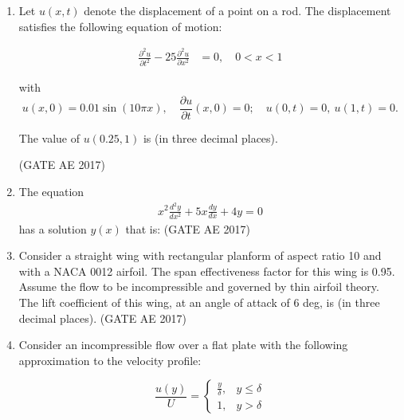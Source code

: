 \documentclass[journal,12pt,onecolumn]{IEEEtran}
\theoremstyle{remark}
\begin{document}
\begin{flushleft}
\begin{enumerate}
\item Let $u(x,t)$ denote the displacement of a point on a rod. The displacement satisfies the following equation of motion:  

\begin{align*}
\frac{\partial^2 u}{\partial t^2} - 25 \frac{\partial^2 u}{\partial x^2} &= 0, \quad 0 < x < 1
\end{align*}

with  
\[
u(x,0) = 0.01 \sin(10 \pi x), \quad \frac{\partial u}{\partial t}(x,0)=0; \quad u(0,t)=0, \ u(1,t)=0.
\]  

The value of $u(0.25,1)$ is \underline{\hspace{2cm}} (in three decimal places).  

\hfill (GATE AE 2017)

\item The equation 
\begin{align*}
x^2 \frac{d^2 y}{dx^2} + 5x \frac{dy}{dx} + 4y = 0
\end{align*}
has a solution $y(x)$ that is:  
\hfill (GATE AE 2017)

\begin{enumerate}
\end{enumerate}

\item Consider a straight wing with rectangular planform of aspect ratio 10 and with a NACA 0012 airfoil.  
The span effectiveness factor for this wing is 0.95. Assume the flow to be incompressible and governed by thin airfoil theory.  
The lift coefficient of this wing, at an angle of attack of 6 deg, is \underline{\hspace{2cm}} (in three decimal places).  
\hfill (GATE AE 2017)

\item Consider an incompressible flow over a flat plate with the following approximation to the velocity profile:  

\[
\frac{u(y)}{U} = 
\begin{cases} 
\frac{y}{\delta}, & y \leq \delta \\
1, & y > \delta
\end{cases}
\]


\end{enumerate}
\end{flushleft}
\end{document}
